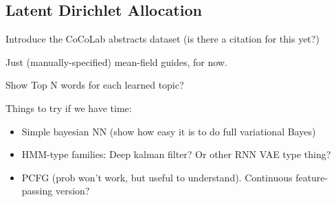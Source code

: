\subsection{Latent Dirichlet Allocation}
\label{sec:results_lda}

Introduce the CoCoLab abstracts dataset (is there a citation for this yet?)

Just (manually-specified) mean-field guides, for now.

Show Top N words for each learned topic?


Things to try if we have time:
\begin{itemize}
\item{Simple bayesian NN (show how easy it is to do full variational Bayes)}
\item{HMM-type families: Deep kalman filter? Or other RNN VAE type thing?}
\item{PCFG (prob won’t work, but useful to understand). Continuous feature-passing version?}
\end{itemize}

